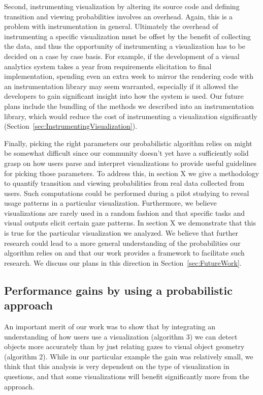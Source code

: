 Second, instrumenting visualization by altering its source code and defining transition and viewing probabilities involves an overhead. Again, this is a problem with instrumentation in general. Ultimately the overhead of instrumenting a specific visualization must be offset by the benefit of collecting the data, and thus the opportunity of instrumenting a visualization has to be decided on a case by case basis. For example, if the development of a visual analytics system takes a year from requirements elicitation to final implementation, spending even an extra week to mirror the rendering code with an instrumentation library may seem warranted, especially if it allowed the developers to gain significant insight into how the system is used. Our future plans include the bundling of the methods we described into an instrumentation library, which would reduce the cost of instrumenting a visualization significantly (Section~\ref{sec:InstrumentingVisualization}). 

Finally, picking the right parameters our probabilistic algorithm relies on might be somewhat difficult since our community doesn't yet have a sufficiently solid grasp on how users parse and interpret visualizations to provide useful guidelines for picking those parameters. To address this, in section X we give a methodology to quantify transition and viewing probabilities from real data collected from users. Such computations could be performed during a pilot studying to reveal usage patterns in a particular visualization. Furthermore, we believe visualizations are rarely used in a random fashion and that specific tasks and visual outputs elicit certain gaze patterns. In section X we demonstrate that this is true for the particular visualization we analyzed. We believe that further research could lead to a more general understanding of the probabilities our algorithm relies on and that our work provides a framework to facilitate such research. We discuss our plans in this direction in Section~\ref{sec:FutureWork}. 

\subsection{Performance gains by using a probabilistic approach}
An important merit of our work was to show that by integrating an understanding of how users use a visualization (algorithm 3) we can detect objects more accurately than by just relating gazes to visual object geometry (algorithm 2). While in our particular example the gain was relatively small, we think that this analysis is very dependent on the type of visualization in questions, and that some visualizations will benefit significantly more from the approach. 

